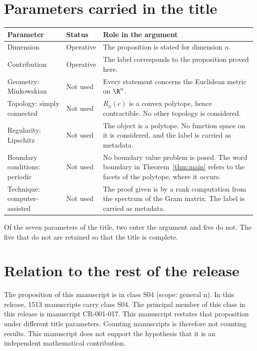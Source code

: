 \documentclass[11pt]{article}
\begin{document}
\section{Parameters carried in the title}\label{sec:params}
\begin{center}
\small
\begin{tabular}{p{}p{}p{}}
\toprule
Parameter & Status & Role in the argument \\
\midrule
Dimension & Operative & The proposition is stated for dimension $n$. \\
Contribution & Operative & The label corresponds to the proposition proved here. \\
Geometry: Minkowskian & Not used & Every statement concerns the Euclidean metric on $\R^n$. \\
Topology: simply connected & Not used & $R_n(c)$ is a convex polytope, hence contractible. No other topology is considered. \\
Regularity: Lipschitz & Not used & The object is a polytope. No function space on it is considered, and the label is carried as metadata. \\
Boundary conditions: periodic & Not used & No boundary value problem is posed. The word boundary in Theorem~\ref{thm:main} refers to the facets of the polytope, where it occurs. \\
Technique: computer-assisted & Not used & The proof given is by a rank computation from the spectrum of the Gram matrix. The label is carried as metadata. \\
\bottomrule
\end{tabular}
\end{center}
Of the seven parameters of the title, two enter the argument and five do not. The five that do not are retained so that the title is complete.

\section{Relation to the rest of the release}
The proposition of this manuscript is in class S04 (scope: general n).
In this release, 1513 manuscripts carry class S04. The principal member of this class in this release is manuscript CR-001-017. This manuscript restates that proposition under different title parameters.
Counting manuscripts is therefore not counting results. This manuscript does not support the hypothesis that it is an independent mathematical contribution.
\end{document}
